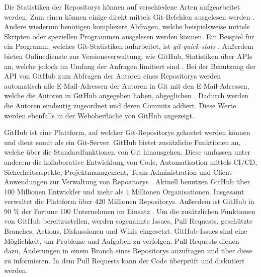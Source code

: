 Die Statistiken der Repositorys können auf verschiedene Arten aufgearbeitet werden.
Zum einen können einige direkt mittels Git-Befehlen ausgelesen werden \autocite{chacon_git_2024}.
Andere wiederum benötigen komplexere Abfragen, welche beispielsweise mittels Skripten oder speziellen Programmen ausgelesen werden können.
Ein Beispiel für ein Programm, welches Git-Statistiken aufarbeitet, ist \emph{git-quick-stats} \autocite{mestan_git-quick-stats_2024}.
Außerdem bieten Onlinedienste zur Versionsverwaltung, wie GitHub, Statistiken über APIs an, welche jedoch im Umfang der Anfragen limitiert sind \autocite{github_rate_2022}.
Bei der Benutzung der API von GitHub zum Abfragen der Autoren eines Repositorys werden automatisch alle E-Mail-Adressen der Autoren in Git mit den E-Mail-Adressen, welche die Autoren in GitHub angegeben haben, abgeglichen \autocite{github_rest-api-endpunkte_2022}.
Dadurch werden die Autoren eindeutig zugeordnet und deren Commits addiert.
Diese Werte werden ebenfalls in der Weboberfläche von GitHub angezeigt.

GitHub ist eine Plattform, auf welcher Git-Repositorys gehostet werden können und dient somit als ein Git-Server.
GitHub bietet zusätzliche Funktionen an, welche über die Standardfunktionen von Git hinausgehen.
Diese umfassen unter anderem die kollaborative Entwicklung von Code, Automatisation mittels CI/CD, Sicherheitsaspekte, Projektmanagement, Team Administration und Client-Anwendungen zur Verwaltung von Repositorys \autocite{ponuthorai_version_2022}.
Aktuell benutzen GitHub über 100 Millionen Entwickler und mehr als 4 Millionen Organisationen.
Insgesamt verwaltet die Plattform über 420 Millionen Repositorys.
Außerdem ist GitHub in 90 \% der Fortune 100 Unternehmen im Einsatz \autocite{github_about_2024}.
Um die zusätzlichen Funktionen von GitHub bereitzustellen, werden sogenannte Issues, Pull Requests, geschützte Branches, Actions, Diskussionen und Wikis eingesetzt.
GitHub-Issues sind eine Möglichkeit, um Probleme und Aufgaben zu verfolgen.
Pull Requests dienen dazu, Änderungen in einem Branch eines Repositorys anzufragen und über diese zu informieren.
In dem Pull Requests kann der Code überprüft und diskutiert werden.
